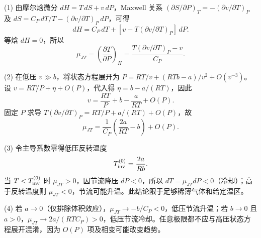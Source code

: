 (1) 由摩尔焓微分 \(dH=T\,dS+v\,dP\)，Maxwell 关系 \((\partial S/\partial P)_T=-(\partial v/\partial T)_P\) 及 \(dS=C_P\,dT/T-(\partial v/\partial T)_P\,dP\)，可得
\[
dH=C_P\,dT+[v-T(\partial v/\partial T)_P]\,dP.
\]
等焓 \(dH=0\)，所以
\[
\mu_{JT}=\left(\frac{\partial T}{\partial P}\right)_H
=\frac{T(\partial v/\partial T)_P-v}{C_P}.
\]

(2) 在低压 \(v\gg b\)，将状态方程展开为 \(P=RT/v+(RTb-a)/v^2+O(v^{-3})\)。设 \(v=RT/P+\eta+O(P)\)，代入得 \(\eta=b-a/(RT)\)，因此
\[
v=\frac{RT}{P}+b-\frac{a}{RT}+O(P).
\]
固定 \(P\) 求导 \(T(\partial v/\partial T)_P=RT/P+a/(RT)+O(P)\)，故
\[
\mu_{JT}=\frac{1}{C_P}\left(\frac{2a}{RT}-b\right)+O(P).
\]

(3) 令主导系数零得低压反转温度
\[
T_{\rm inv}^{(0)}=\frac{2a}{Rb}.
\]
当 \(T<T_{\rm inv}^{(0)}\) 时 \(\mu_{JT}>0\)，因节流降压 \(dP<0\)，所以 \(dT=\mu_{JT}dP<0\)（冷却）；高于反转温度则 \(\mu_{JT}<0\)，节流可能升温。此结论限于足够稀薄气体和给定温区。

(4) 若 \(a\to0\)（仅排除体积效应），\(\mu_{JT}\to-b/C_P<0\)，低压节流升温；若 \(b\to0\) 且 \(a>0\)，\(\mu_{JT}\to2a/(RTC_P)>0\)，低压节流冷却。任意极限都不应与高压状态方程展开混淆，因为 \(O(P)\) 项及相变可能改变趋势。
